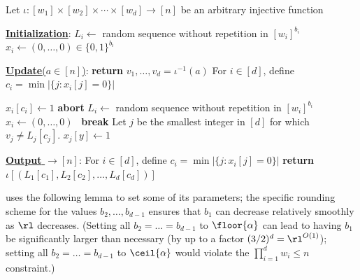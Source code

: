 \begin{itemize}
\begin{itemize}
\begin{algorithm}
\begin{algorithmic}[1]
  \Statex Let $\iota : [w_1]\times[w_2]\times \cdots \times [w_d] \rightarrow [n]$ be an arbitrary injective function
  
  \Statex
  \Statex \ul{\textbf{Initialization}}:
      \State $L_i \gets $ random sequence without repetition in $[w_i]^{b_i}$
      \State $x_i \gets (0,\ldots,0) \in \{0,1\}^{b_i}$
    \EndFor
    
  \Statex
  \Statex \ul{\textbf{Update}($a \in [n]$)}: %
     \textbf{return} \EndIf
    \State $v_1,\ldots,v_d = \iota^{-1}(a)$ 
    \State For $i \in [d]$, define $c_i = \min |\{j : x_i[j] = 0\}|$
    
          \State $x_i[c_i] \gets 1$
             \textbf{abort}  \EndIf
            \State $L_i \gets $ random sequence without repetition in $[w_i]^{b_i}$
            \State $x_i \gets (0,\ldots,0)$
          \Else \ \textbf{break}
          \EndIf
        \EndFor
    \Else
        \State Let $j$ be the smallest integer in $[d]$ for which $v_j \ne L_{j}[c_j]$. 
            \State $x_j[y] \gets 1$
        \EndIf
    \EndIf
    
  \Statex
  \Statex \ul{\textbf{Output} $\rightarrow [n]$}:
    \State For $i \in [d]$, define $c_i = \min |\{j : x_i[j] = 0\}|$
    \State \textbf{return} $\iota[ (L_1[c_1],L_2[c_2],\ldots,L_d[c_d]) ]$
  \end{algorithmic}
  
\end{algorithm}

 uses the following lemma to set some of its parameters; the specific rounding scheme for the values $b_2,\ldots,b_{d-1}$ ensures that $b_1$ can
decrease relatively smoothly as $\rl$ decreases. (Setting all $b_2=\ldots=b_{d -1}$ to $\floor{\alpha}$ can lead to having $b_1$ be significantly larger than
necessary (by up to a factor $(3/2)^d = \rl^{O(1)}$); setting all $b_2=\ldots=b_{d -1}$ to $\ceil{\alpha}$ would violate the $\prod_{i=1}^{d} w_i \le n$ constraint.)


\end{itemize}
\end{itemize}
